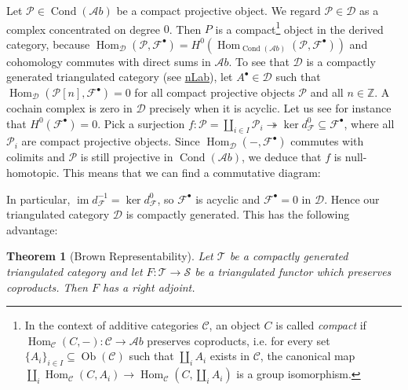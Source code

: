 \documentclass[11pt,A4]{article}
\theoremstyle{plain}
\newtheorem{thm}{Theorem}[section]
\theoremstyle{definition}
\theoremstyle{remark}
\newcommand{\Z}{\mathbb{Z}}
\newcommand{\1}{\mathbbm{1}}
\newcommand{\F}{\mathcal{F}}
\newcommand{\calP}{\mathcal{P}}
\newcommand{\scrC}{\mathscr{C}}
\newcommand{\Ab}{\mathscr{A}b}
\newcommand{\D}{\mathscr{D}}
\DeclareMathOperator{\Hom}{Hom}
\DeclareMathOperator{\Cond}{Cond}
\DeclareMathOperator{\Ob}{Ob}
\DeclareMathOperator{\im}{im}
\newcommand{\grd}{^{\bullet}}
\begin{document}
Let $\calP\in \Cond(\Ab)$ be a compact projective object.
We regard $\calP\in \D$ as a complex concentrated on degree $0$.
Then $P$ is a compact\footnote{In the context of additive categories $\scrC$, an object $C$ is called \textit{compact} if $\Hom_{\scrC}(C,-)\colon \scrC\to \Ab$ preserves coproducts, i.e. for every set $\{A_{i}\}_{i\in I}\subseteq \Ob(\scrC)$ such that $\coprod_{i}A_{i}$ exists in $\scrC$, the canonical map $\coprod_{i}\Hom_{\scrC}(C,A_{i})\to \Hom_{\scrC}(C,\coprod_{i}A_{i})$ is a group isomorphism.} object in the derived category, because $\Hom_{\D}(\calP,\F\grd)=H^{0}(\Hom_{\Cond(\Ab)}(\calP,\F\grd))$ and cohomology commutes with direct sums in $\Ab$.
To see that $\D$ is a compactly generated triangulated category (see \href{https://ncatlab.org/nlab/show/compactly+generated+triangulated+category}{nLab}), let $A\grd\in \D$ such that $\Hom_{\D}(\calP[n],\F\grd)=0$ for all compact projective objects $\calP$ and all $n\in \Z$.
A cochain complex is zero in $\D$ precisely when it is acyclic.
Let us see for instance that $H^{0}(\F\grd)=0$.
Pick a surjection $f\colon \calP=\coprod_{i\in I}\calP_{i}\twoheadrightarrow \ker{d_{\F}^{0}}\subseteq \F\grd$, where all $\calP_{i}$ are compact projective objects.
Since $\Hom_{\D}(-,\F\grd)$ commutes with colimits and $\calP$ is still projective in $\Cond(\Ab)$, we deduce that $f$ is null-homotopic.
This means that we can find a commutative diagram:
\begin{center}
\end{center}
In particular, $\im{d_{\F}^{-1}}=\ker{d_{\F}^{0}}$, so $\F\grd$ is acyclic and $\F\grd=0$ in $\D$.
Hence our triangulated category $\D$ is compactly generated.
This has the following advantage:

\begin{thm}[Brown Representability]
    Let $\mathscr{T}$ be a compactly generated triangulated category and let $F\colon \mathscr{T}\to \mathscr{S}$ be a triangulated functor which preserves coproducts.
    Then $F$ has a right adjoint.
\end{thm}



\end{document}
